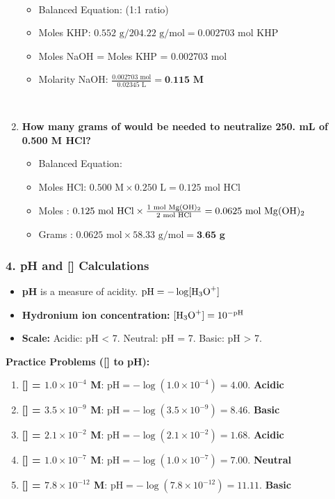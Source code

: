 \documentclass{article}
\begin{document}
\begin{enumerate}[itemsep=5pt]
    \begin{itemize}
        \item Balanced Equation:  (1:1 ratio)
        \item Moles KHP: $0.552 \text{ g} / 204.22 \text{ g/mol} = 0.002703 \text{ mol KHP}$
        \item Moles NaOH = Moles KHP = 0.002703 mol
        \item Molarity NaOH: $\frac{0.002703 \text{ mol}}{0.02345 \text{ L}} = \textbf{0.115 M}$
    \end{itemize}
    \item \textbf{How many grams of  would be needed to neutralize 250. mL of 0.500 M HCl?}
    \begin{itemize}
        \item Balanced Equation: 
        \item Moles HCl: $0.500 \text{ M} \times 0.250 \text{ L} = 0.125 \text{ mol HCl}$
        \item Moles : $0.125 \text{ mol HCl} \times \frac{1 \text{ mol } \ce{Mg(OH)2}}{2 \text{ mol HCl}} = 0.0625 \text{ mol } \ce{Mg(OH)2}$
        \item Grams : $0.0625 \text{ mol} \times 58.33 \text{ g/mol} = \textbf{3.65 g}$
    \end{itemize}
\end{enumerate}

\bigskip
\subsubsection*{4. pH and [] Calculations}
\begin{itemize}[itemsep=5pt]
    \item \textbf{pH} is a measure of acidity. $\text{pH} = -\log[\ce{H3O+}]$
    \item \textbf{Hydronium ion concentration:} $[\ce{H3O+}] = 10^{-\text{pH}}$
    \item \textbf{Scale:} Acidic: pH < 7. Neutral: pH = 7. Basic: pH > 7.
\end{itemize}

\textbf{Practice Problems ([] to pH):}
\begin{enumerate}[itemsep=5pt]
    \item \textbf{[] = $1.0 \times 10^{-4}$ M}: $\text{pH} = -\log(1.0 \times 10^{-4}) = 4.00$. \textbf{Acidic}
    \item \textbf{[] = $3.5 \times 10^{-9}$ M}: $\text{pH} = -\log(3.5 \times 10^{-9}) = 8.46$. \textbf{Basic}
    \item \textbf{[] = $2.1 \times 10^{-2}$ M}: $\text{pH} = -\log(2.1 \times 10^{-2}) = 1.68$. \textbf{Acidic}
    \item \textbf{[] = $1.0 \times 10^{-7}$ M}: $\text{pH} = -\log(1.0 \times 10^{-7}) = 7.00$. \textbf{Neutral}
    \item \textbf{[] = $7.8 \times 10^{-12}$ M}: $\text{pH} = -\log(7.8 \times 10^{-12}) = 11.11$. \textbf{Basic}
\end{enumerate}
\end{document}
